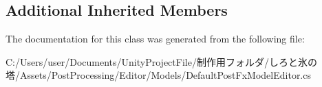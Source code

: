 \subsection*{Additional Inherited Members}


The documentation for this class was generated from the following file\+:\begin{DoxyCompactItemize}
\item 
C\+:/\+Users/user/\+Documents/\+Unity\+Project\+File/制作用フォルダ/しろと氷の塔/\+Assets/\+Post\+Processing/\+Editor/\+Models/Default\+Post\+Fx\+Model\+Editor.\+cs\end{DoxyCompactItemize}
